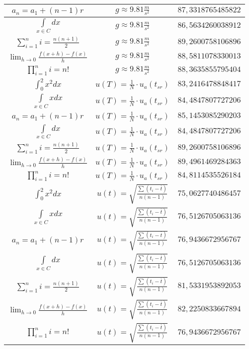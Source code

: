 \documentclass{article}
\begin{document}
\begin{flushleft}
\begin{longtable}{|c|c|c|}
$a_{n}=a_{1}+(n-1)r$ & $g\approx9.81\frac{m}{s^2}$ & $87,3318765485822$ \\ \hline 
$\int \limits_{x\in C}dx$ & $g\approx9.81\frac{m}{s^2}$ & $86,5634260038912$ \\ \hline 
$\sum_{i=1}^{n}i=\frac{n(n+1)}{2}$ & $g\approx9.81\frac{m}{s^2}$ & $89,2600758106896$ \\ \hline 
$\lim_{h\to0}\frac{f(x+h)-f(x)}{h}$ & $g\approx9.81\frac{m}{s^2}$ & $88,5811078330013$ \\ \hline 
$\prod_{i=1}^ni=n!$ & $g\approx9.81\frac{m}{s^2}$ & $88,3635855795404$ \\ \hline 
$\int _0^2x^2dx$ & $u(T)=\frac{1}{N}\cdot u_a(t_{sr})$ & $83,2416478848417$ \\ \hline 
$\int \limits_{x\in C}xdx$ & $u(T)=\frac{1}{N}\cdot u_a(t_{sr})$ & $84,4847807727206$ \\ \hline 
$a_{n}=a_{1}+(n-1)r$ & $u(T)=\frac{1}{N}\cdot u_a(t_{sr})$ & $85,1453085290203$ \\ \hline 
$\int \limits_{x\in C}dx$ & $u(T)=\frac{1}{N}\cdot u_a(t_{sr})$ & $84,4847807727206$ \\ \hline 
$\sum_{i=1}^{n}i=\frac{n(n+1)}{2}$ & $u(T)=\frac{1}{N}\cdot u_a(t_{sr})$ & $89,2600758106896$ \\ \hline 
$\lim_{h\to0}\frac{f(x+h)-f(x)}{h}$ & $u(T)=\frac{1}{N}\cdot u_a(t_{sr})$ & $89,4961469284363$ \\ \hline 
$\prod_{i=1}^ni=n!$ & $u(T)=\frac{1}{N}\cdot u_a(t_{sr})$ & $84,8114535526184$ \\ \hline 
$\int _0^2x^2dx$ & $u(t)=\sqrt{\frac{\sum(t_i-\overline{t})}{n(n-1)}}$ & $75,0627740486457$ \\ \hline 
$\int \limits_{x\in C}xdx$ & $u(t)=\sqrt{\frac{\sum(t_i-\overline{t})}{n(n-1)}}$ & $76,5126705063136$ \\ \hline 
$a_{n}=a_{1}+(n-1)r$ & $u(t)=\sqrt{\frac{\sum(t_i-\overline{t})}{n(n-1)}}$ & $76,9436672956767$ \\ \hline 
$\int \limits_{x\in C}dx$ & $u(t)=\sqrt{\frac{\sum(t_i-\overline{t})}{n(n-1)}}$ & $76,5126705063136$ \\ \hline 
$\sum_{i=1}^{n}i=\frac{n(n+1)}{2}$ & $u(t)=\sqrt{\frac{\sum(t_i-\overline{t})}{n(n-1)}}$ & $81,5331953892053$ \\ \hline 
$\lim_{h\to0}\frac{f(x+h)-f(x)}{h}$ & $u(t)=\sqrt{\frac{\sum(t_i-\overline{t})}{n(n-1)}}$ & $82,2250833667894$ \\ \hline 
$\prod_{i=1}^ni=n!$ & $u(t)=\sqrt{\frac{\sum(t_i-\overline{t})}{n(n-1)}}$ & $76,9436672956767$ \\ \hline 

\end{longtable}
\end{flushleft}
\end{document}
